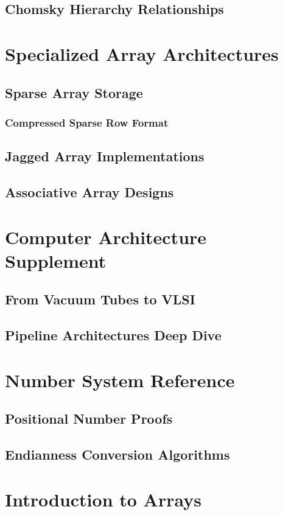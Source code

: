 \documentclass[12pt, oneside]{book}
\begin{document}
	 \section{Chomsky Hierarchy Relationships}
	 
	 \chapter{Specialized Array Architectures}
	 \section{Sparse Array Storage}
	 \subsection{Compressed Sparse Row Format}
	 \section{Jagged Array Implementations}
	 \section{Associative Array Designs}

	 \chapter{Computer Architecture Supplement}
	 \section{From Vacuum Tubes to VLSI}
	 \section{Pipeline Architectures Deep Dive}
	 
	 \chapter{Number System Reference}
	 \section{Positional Number Proofs}
	 \section{Endianness Conversion Algorithms}
	 
	\chapter{Introduction to Arrays}
\end{document}
